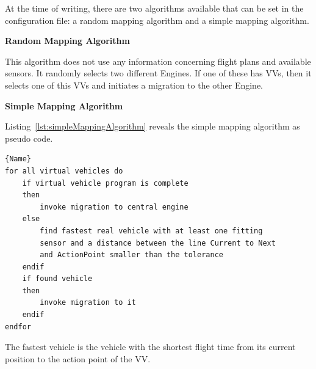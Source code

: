 At the time of writing, there are two algorithms available that can be set in the configuration file: a random
mapping algorithm and a simple mapping algorithm.

\textbf{Random Mapping Algorithm}

This algorithm does not use any information concerning flight plans and available sensors.
It randomly selects two different Engines. If one of these has \acp{VV}, then it selects one of this \acp{VV}
and initiates a migration to the other Engine.

\textbf{Simple Mapping Algorithm}

Listing~\ref{lst:simpleMappingAlgorithm} reveals the simple mapping algorithm as pseudo code. 

\lstset{tabsize=3,language=PseudoCode}
\begin{lstlisting}[caption={Simple Mapping Algorithm},mathescape=true,label=lst:simpleMappingAlgorithm]{Name}
for all virtual vehicles do
	if virtual vehicle program is complete
	then
		invoke migration to central engine
	else
		find fastest real vehicle with at least one fitting
		sensor and a distance between the line Current to Next
		and ActionPoint smaller than the tolerance
	endif
	if found vehicle 
	then 
		invoke migration to it 
	endif
endfor
\end{lstlisting}

The fastest vehicle is the vehicle with the shortest flight time from its current position to the action
point of the \ac{VV}.


